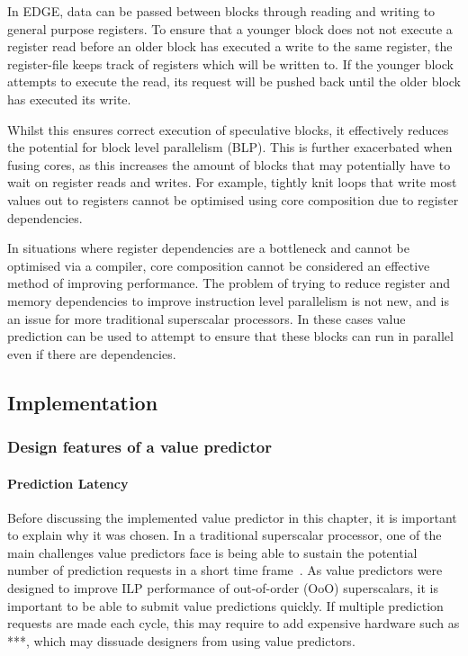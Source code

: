 In EDGE, data can be passed between blocks through reading and writing to general purpose registers.
To ensure that a younger block does not not execute a register read before an older block has executed a write to the same register, the register-file keeps track of registers which will be written to.
If the younger block attempts to execute the read, its request will be pushed back until the older block has executed its write.

Whilst this ensures correct execution of speculative blocks, it effectively reduces the potential for block level parallelism (BLP).
This is further exacerbated when fusing cores, as this increases the amount of blocks that may potentially have to wait on register reads and writes.
For example, tightly knit loops that write most values out to registers cannot be optimised using core composition due to register dependencies.

In situations where register dependencies are a bottleneck and cannot be optimised via a compiler, core composition cannot be considered an effective method of improving performance.
The problem of trying to reduce register and memory dependencies to improve instruction level parallelism is not new, and is an issue for more traditional superscalar processors.
In these cases value prediction can be used to attempt to ensure that these blocks can run in parallel even if there are dependencies.

\subsection{Implementation}

\subsubsection{Design features of a value predictor}
\paragraph*{Prediction Latency} Before discussing the implemented value predictor in this chapter, it is important to explain why it was chosen.
In a traditional superscalar processor, one of the main challenges value predictors face is being able to sustain the potential number of prediction requests in a short time frame~\cite{peraisBeBop2015}.
As value predictors were designed to improve ILP performance of out-of-order (OoO) superscalars, it is important to be able to submit value predictions quickly.
If multiple prediction requests are made each cycle, this may require to add expensive hardware such as ***, which may dissuade designers from using value predictors.

